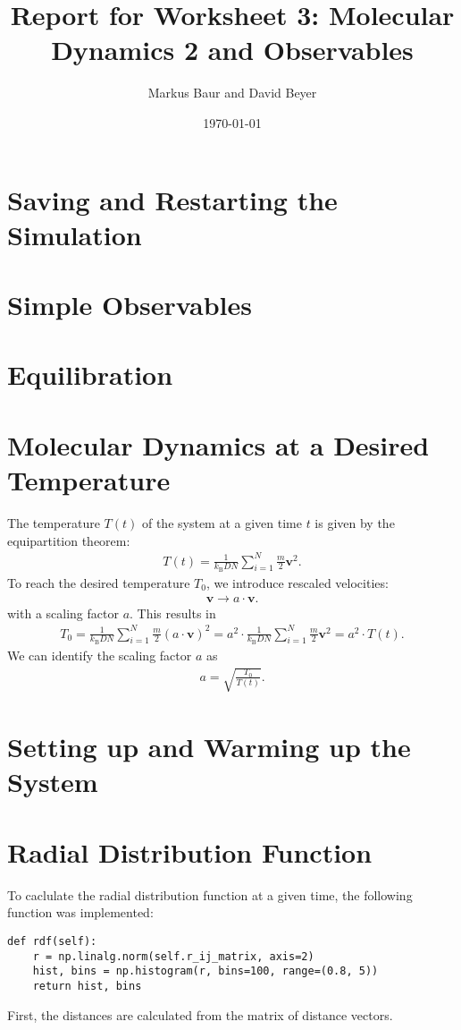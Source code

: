 \documentclass[a4paper,10pt,bibtotoc]{scrartcl}
\begin{document}
\titlehead{Simulation Methods in Physics I \hfill WS 2019/2010}
\title{Report for Worksheet 3: Molecular Dynamics 2 and Observables}
\author{Markus Baur and David Beyer}
\date{\today}
\maketitle

\tableofcontents

\section{Saving and Restarting the Simulation}
\section{Simple Observables}
\section{Equilibration}
\section{Molecular Dynamics at a Desired Temperature}
The temperature $T(t)$ of the system at a given time $t$ is given by the equipartition theorem:
\begin{align}
T(t) = \frac{1}{k_\mathrm{B}DN}\sum_{i=1}^{N}\frac{m}{2}\mathbf{v}^2.
\end{align}
To reach the desired temperature $T_0$, we introduce rescaled velocities:
\begin{align}
\mathbf{v}\rightarrow a\cdot\mathbf{v}.
\end{align}
with a scaling factor $a$. 
This results in
\begin{align}
T_0 = \frac{1}{k_\mathrm{B}DN}\sum_{i=1}^{N}\frac{m}{2}\left(a\cdot\mathbf{v}\right)^2 =a^2\cdot \frac{1}{k_\mathrm{B}DN}\sum_{i=1}^{N}\frac{m}{2}\mathbf{v}^2 = a^2\cdot T(t).
\end{align}
We can identify the scaling factor $a$ as
\begin{align}
a = \sqrt{\frac{T_0}{T(t)}}.
\end{align}

\section{Setting up and Warming up the System}
\section{Radial Distribution Function}
To caclulate the radial distribution function at a given time, the following function was implemented:
\begin{lstlisting}
def rdf(self):
    r = np.linalg.norm(self.r_ij_matrix, axis=2)
    hist, bins = np.histogram(r, bins=100, range=(0.8, 5))
    return hist, bins
\end{lstlisting}
First, the distances are calculated from the matrix of distance vectors. 
\end{document}
